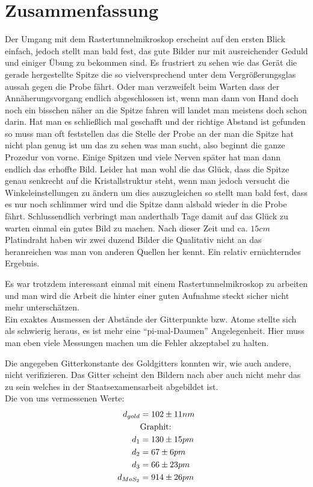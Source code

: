\documentclass[12pt]{article}
\begin{document}
\section{Zusammenfassung}
Der Umgang mit dem Rastertunnelmikroskop erscheint auf den ersten Blick einfach, jedoch stellt man bald fest, das gute Bilder nur mit ausreichender Geduld und einiger Übung zu bekommen sind. Es frustriert zu sehen wie das Gerät die gerade hergestellte Spitze die so vielversprechend unter dem Vergrößerungsglas aussah gegen die Probe fährt. Oder man verzweifelt beim Warten dass der Annäherungsvorgang endlich abgeschlossen ist, wenn man dann von Hand doch noch ein bisschen näher an die Spitze fahren will landet man meistens doch schon darin. Hat man es schließlich mal geschafft und der richtige Abstand ist gefunden so muss man oft feststellen das die Stelle der Probe an der man die Spitze hat nicht plan genug ist um das zu sehen was man sucht, also beginnt die ganze Prozedur von vorne. Einige Spitzen und viele Nerven später hat man dann endlich das erhoffte Bild. Leider hat man wohl die das Glück, dass die Spitze genau senkrecht auf die Kristallstruktur steht, wenn man jedoch versucht die Winkeleinstellungen zu ändern um dies auszugleichen so stellt man bald fest, dass es nur noch schlimmer wird und die Spitze dann alsbald wieder in die Probe fährt. Schlussendlich verbringt man anderthalb Tage damit auf das Glück zu warten einmal ein gutes Bild zu machen. Nach dieser Zeit und ca. $15cm$ Platindraht haben wir zwei duzend Bilder die Qualitativ nicht an das heranreichen was man von anderen Quellen her kennt. Ein relativ ernüchterndes Ergebnis.

Es war trotzdem interessant einmal mit einem Rastertunnelmikroskop zu arbeiten und man wird die Arbeit die hinter einer guten Aufnahme steckt sicher nicht mehr unterschätzen.\\

Ein exaktes Ausmessen der Abstände der Gitterpunkte bzw. Atome stellte sich als schwierig heraus, es ist mehr eine ``pi-mal-Daumen'' Angelegenheit. Hier muss man eben viele Messungen machen um die Fehler akzeptabel zu halten.

Die angegeben Gitterkonstante des Goldgitters konnten wir, wie auch andere, nicht verifizieren. Das Gitter scheint den Bildern nach aber auch nicht mehr das zu sein welches in der Staatsexamensarbeit abgebildet ist.\\

Die von uns vermessenen Werte:
\begin{align*}
 d_{gold} &= 102 \pm 11 nm \\
 &\textnormal{Graphit:} \\
 d_1 &= 130 \pm 15 pm \\
 d_2 &= 67 \pm 6 pm \\
 d_3 &= 66 \pm 23 pm \\
 d_{MoS_2} &= 914 \pm 26 pm
\end{align*}
\end{document}
